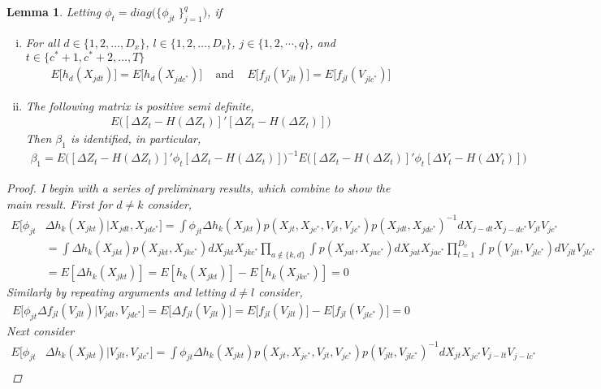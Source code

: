 \documentclass[10pt]{article}
\newtheorem{lemma}{Lemma}
\begin{document}
\begin{lemma}
Letting $\phi_{t} = diag\big( \{\phi_{jt}\;\}_{j=1}^q \big)$, if
\begin{enumerate}[i.)] 
\item For all $d\in \{1,2, \ldots , D_x\}$, $l\in \{1,2, \ldots , D_v\}$, $j\in \{1,2, \cdots , q\}$, and $t\in \{c^*+1, c^*+2, \ldots , T\}$
\begin{align*}
E\big[ h_d(X_{jdt})\big] = E\big[ h_d(X_{jdc^*}) \big]  \;\;\; \text{ and } \;\;\; E\big[ f_{jl}(V_{jlt})\big] = E\big[ f_{jl}(V_{jlc^*}) \big] 
\end{align*}

\item The following matrix is positive semi definite,
\begin{align*} 
E \Big( [\Delta Z_t - H(\Delta Z_t)]' [\Delta Z_t - H(\Delta Z_t)] \Big)
\end{align*}
Then $\beta_1$ is identified, in particular,
\begin{align*} 
\beta_1 = E \Big( [\Delta Z_t - H(\Delta Z_t)]' \phi_{t} [\Delta Z_t - H(\Delta Z_t)] \Big)^{-1}E \Big( [\Delta Z_t - H(\Delta Z_t)]' \phi_{t} [\Delta Y_t - H(\Delta Y_t)] \Big)
\end{align*} 
\end{enumerate}
\begin{proof} I begin with a series of preliminary results, which combine to show the main result. First for $d \neq k$ consider,
\begin{align*} 
E \big[ \phi_{jt} & \Delta h_k(X_{jkt}) |X_{jdt},X_{jdc^*} \big]  = \int \phi_{jt} \Delta h_k(X_{jkt}) p(X_{jt},X_{jc^*},V_{jt},V_{jc^*})p(X_{jdt},X_{jdc^*})^{-1}dX_{j-dt}X_{j-dc^*}V_{jt}V_{jc^*} \\
%
& = \int \Delta h_k(X_{jkt}) p(X_{jkt},X_{jkc^*}) dX_{jkt} X_{jkc^*} \prod_{a \notin \{k,d\}}\int p(X_{jat},X_{jac^*}) dX_{jat} X_{jac^*} \prod_{l=1}^{D_v} \int p(V_{jlt},V_{jlc^*}) dV_{jlt} V_{jlc^*} \\
& = E[ \Delta h_k(X_{jkt}) ] = E[ h_k(X_{jkt}) ] - E[ h_k(X_{jkc^*}) ]  = 0
\end{align*}
Similarly by repeating arguments and letting $d \neq l$ consider,
\begin{align*} 
E \big[\phi_{jt} \Delta f_{jl}(V_{jlt}) |V_{jdt},V_{jdc^*} \big] = E\big[ \Delta f_{jl}(V_{jlt}) \big] = E\big[ f_{jl}(V_{jlt}) \big]  - E\big[ f_{jl}(V_{jlc^*}) \big] = 0
\end{align*}
Next consider 
\begin{align*}
E \big[ \phi_{jt} & \Delta h_k(X_{jkt}) |V_{jlt},V_{jlc^*} \big] =  \int \phi_{jt} \Delta h_k(X_{jkt}) p(X_{jt},X_{jc^*},V_{jt},V_{jc^*})p(V_{jlt},V_{jlc^*})^{-1}dX_{jt}X_{jc^*}V_{j-lt}V_{j-lc^*} \\

\end{align*}
\end{proof}
\end{lemma}
\end{document}
